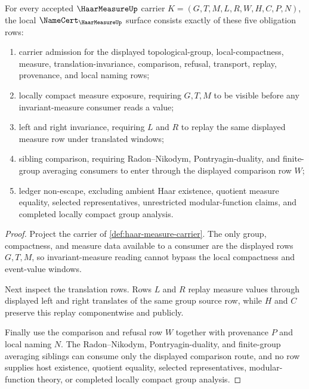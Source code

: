 \begin{theorem}
\label{thm:haar-measure-namecert-obligations}
For every accepted $\HaarMeasureUp$ carrier $K=(G,T,M,L,R,W,H,C,P,N)$, the local $\NameCert_{\HaarMeasureUp}$ surface consists exactly of these five obligation rows:
\begin{enumerate}
\item carrier admission for the displayed topological-group, local-compactness, measure, translation-invariance, comparison, refusal, transport, replay, provenance, and local naming rows;
\item locally compact measure exposure, requiring $G,T,M$ to be visible before any invariant-measure consumer reads a value;
\item left and right invariance, requiring $L$ and $R$ to replay the same displayed measure row under translated windows;
\item sibling comparison, requiring Radon--Nikodym, Pontryagin-duality, and finite-group averaging consumers to enter through the displayed comparison row $W$;
\item ledger non-escape, excluding ambient Haar existence, quotient measure equality, selected representatives, unrestricted modular-function claims, and completed locally compact group analysis.
\end{enumerate}
\end{theorem}
\begin{proof}
Project the carrier of \autoref{def:haar-measure-carrier}. The only group, compactness, and measure data available to a consumer are the displayed rows $G,T,M$, so invariant-measure reading cannot bypass the local compactness and event-value windows.

Next inspect the translation rows. Rows $L$ and $R$ replay measure values through displayed left and right translates of the same group source row, while $H$ and $C$ preserve this replay componentwise and publicly.

Finally use the comparison and refusal row $W$ together with provenance $P$ and local naming $N$. The Radon--Nikodym, Pontryagin-duality, and finite-group averaging siblings can consume only the displayed comparison route, and no row supplies host existence, quotient equality, selected representatives, modular-function theory, or completed locally compact group analysis.
\end{proof}


